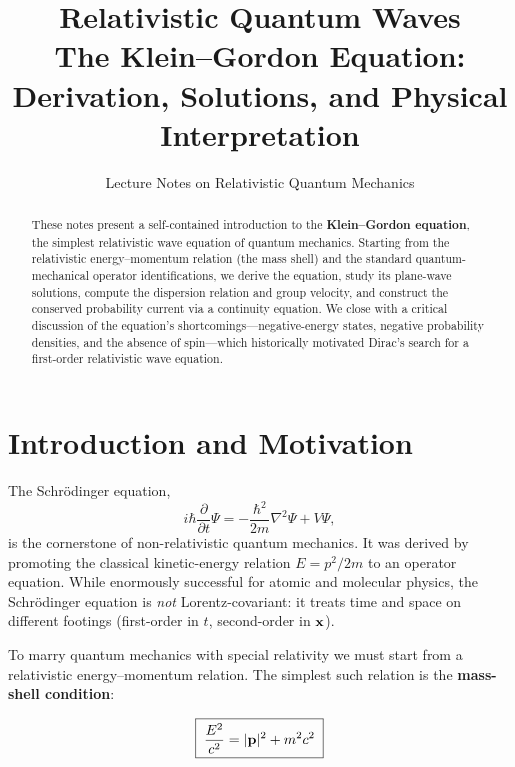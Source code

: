 \documentclass[12pt, a4paper]{article}
\title{
    \vspace{-1cm}
    \textbf{Relativistic Quantum Waves} \\[6pt]
    \Large The Klein--Gordon Equation: \\
    Derivation, Solutions, and Physical Interpretation
}
\author{Lecture Notes on Relativistic Quantum Mechanics}
\date{}
\theoremstyle{definition}
\begin{document}
\maketitle
\thispagestyle{fancy}

\begin{abstract}
\noindent
These notes present a self-contained introduction to the \textbf{Klein--Gordon equation}, the simplest relativistic wave equation of quantum mechanics.
Starting from the relativistic energy--momentum relation (the mass shell) and the standard quantum-mechanical operator identifications, we derive the equation, study its plane-wave solutions, compute the dispersion relation and group velocity, and construct the conserved probability current via a continuity equation.
We close with a critical discussion of the equation's shortcomings---negative-energy states, negative probability densities, and the absence of spin---which historically motivated Dirac's search for a first-order relativistic wave equation.
\end{abstract}

\tableofcontents
\newpage

\section{Introduction and Motivation}

The Schr\"{o}dinger equation,
\begin{equation}
    i\hbar\frac{\partial}{\partial t}\Psi
    = -\frac{\hbar^{2}}{2m}\nabla^{2}\Psi + V\Psi,
\end{equation}
is the cornerstone of non-relativistic quantum mechanics.  It was derived by
promoting the classical kinetic-energy relation $E = p^{2}/2m$ to an operator
equation.  While enormously successful for atomic and molecular physics, the
Schr\"{o}dinger equation is \emph{not} Lorentz-covariant: it treats time and
space on different footings (first-order in $t$, second-order in $\vb{x}$).

To marry quantum mechanics with special relativity we must start from a
relativistic energy--momentum relation.  The simplest such relation is the
\textbf{mass-shell condition}:

\begin{equation}\label{eq:mass-shell}
    \boxed{\;
    \frac{E^{2}}{c^{2}} = |\vb{p}|^{2} + m^{2}c^{2}
    \;}
\end{equation}
\end{document}
